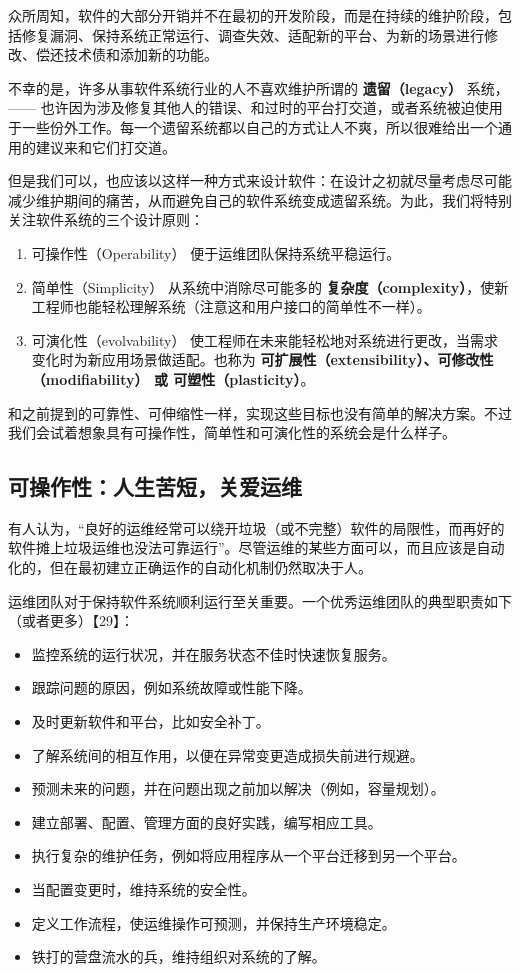 众所周知，软件的大部分开销并不在最初的开发阶段，而是在持续的维护阶段，包括修复漏洞、保持系统正常运行、调查失效、适配新的平台、为新的场景进行修改、偿还技术债和添加新的功能。

不幸的是，许多从事软件系统行业的人不喜欢维护所谓的 \textbf{遗留（legacy）} 系统，—— 也许因为涉及修复其他人的错误、和过时的平台打交道，或者系统被迫使用于一些份外工作。每一个遗留系统都以自己的方式让人不爽，所以很难给出一个通用的建议来和它们打交道。

但是我们可以，也应该以这样一种方式来设计软件：在设计之初就尽量考虑尽可能减少维护期间的痛苦，从而避免自己的软件系统变成遗留系统。为此，我们将特别关注软件系统的三个设计原则：

\begin{enumerate}
  \item 可操作性（Operability）
        便于运维团队保持系统平稳运行。
  \item 简单性（Simplicity）
        从系统中消除尽可能多的 \textbf{复杂度（complexity）}，使新工程师也能轻松理解系统（注意这和用户接口的简单性不一样）。
  \item 可演化性（evolvability）
        使工程师在未来能轻松地对系统进行更改，当需求变化时为新应用场景做适配。也称为 \textbf{可扩展性（extensibility）\textbf{、\textbf{可修改性（modifiability）} 或 }可塑性（plasticity）}。
\end{enumerate}

和之前提到的可靠性、可伸缩性一样，实现这些目标也没有简单的解决方案。不过我们会试着想象具有可操作性，简单性和可演化性的系统会是什么样子。

\subsection{可操作性：人生苦短，关爱运维}

有人认为，“良好的运维经常可以绕开垃圾（或不完整）软件的局限性，而再好的软件摊上垃圾运维也没法可靠运行”。尽管运维的某些方面可以，而且应该是自动化的，但在最初建立正确运作的自动化机制仍然取决于人。

运维团队对于保持软件系统顺利运行至关重要。一个优秀运维团队的典型职责如下（或者更多）【29】：

\begin{itemize}
  \item 监控系统的运行状况，并在服务状态不佳时快速恢复服务。
  \item 跟踪问题的原因，例如系统故障或性能下降。
  \item 及时更新软件和平台，比如安全补丁。
  \item 了解系统间的相互作用，以便在异常变更造成损失前进行规避。
  \item 预测未来的问题，并在问题出现之前加以解决（例如，容量规划）。
  \item 建立部署、配置、管理方面的良好实践，编写相应工具。
  \item 执行复杂的维护任务，例如将应用程序从一个平台迁移到另一个平台。
  \item 当配置变更时，维持系统的安全性。
  \item 定义工作流程，使运维操作可预测，并保持生产环境稳定。
  \item 铁打的营盘流水的兵，维持组织对系统的了解。
\end{itemize}


